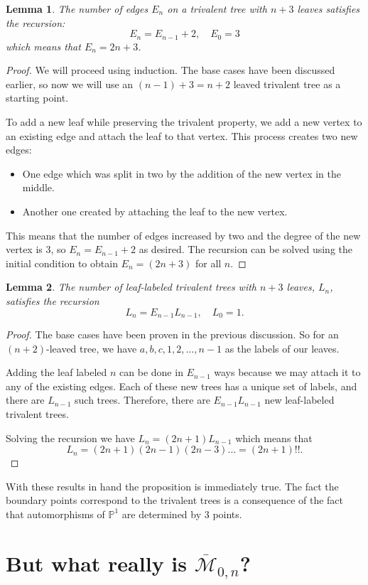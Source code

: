 \documentclass[11pt]{article}
\newcommand{\bP}{\mathbb{P}}
\newcommand{\ov}{\overline}        %
\newcommand{\cM}{\mathcal{M}}           %
\newtheorem{Lem}{Lemma}                 %
\theoremstyle{definition}
\theoremstyle{remark}
\numberwithin{theorem}{section}
\begin{document}
\begin{Lem}
The number of edges $E_n$ on a trivalent tree with $n+3$ leaves satisfies the recursion:
$$E_n=E_{n-1}+2,\quad E_0=3$$
which means that $E_n=2n+3$.
\end{Lem}

\begin{proof}
    We will proceed using induction. The base cases have been discussed earlier, so now we will use an $(n-1)+3=n+2$ leaved trivalent tree as a starting point.\par 
To add a new leaf while preserving the trivalent property, we add a new vertex to an existing edge and attach the leaf to that vertex. This process creates two new edges: 
\begin{itemize}
    \item One edge which was split in two by the addition of the new vertex in the middle.
    \item Another one created by attaching the leaf to the new vertex.
\end{itemize}
  This means that the number of edges increased by two and the degree of the new vertex is $3$, so $E_n=E_{n-1}+2$ as desired. The recursion can be solved using the initial condition to obtain $E_n=(2n+3)$ for all $n$.
\end{proof}

\begin{Lem}
The number of leaf-labeled trivalent trees with $n+3$ leaves, $L_n$, satisfies the recursion 
$$L_{n}=E_{n-1}L_{n-1},\quad L_0=1.$$ 
\end{Lem}

\begin{proof}
    The base cases have been proven in the previous discussion. So for an $(n+2)$-leaved tree, we have ${a,b,c,1,2,\dots,n-1}$ as the labels of our leaves.\par 
    Adding the leaf labeled $n$ can be done in $E_{n-1}$ ways because we may attach it to any of the existing edges. Each of these new trees has a unique set of labels, and there are $L_{n-1}$ such trees. Therefore, there are $E_{n-1}L_{n-1}$ new leaf-labeled trivalent trees.\par 
    Solving the recursion we have $L_n=(2n+1)L_{n-1}$ which means that 
    $$L_n=(2n+1)(2n-1)(2n-3)\dots=(2n+1)!!.$$
\end{proof}

With these results in hand the proposition is immediately true. The fact the boundary points correspond to the trivalent trees is a consequence of the fact that automorphisms of $\bP^1$ are determined by $3$ points.

\section{But what really is $\ov{\cM}_{0,n}$?}


\nocite{*}


\end{document}
